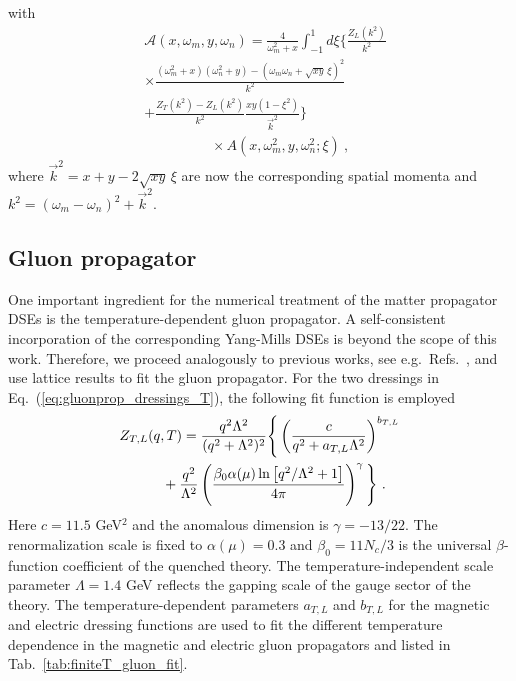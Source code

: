 \documentclass[final,twocolumn,merge,sort&compress]{elsarticle}
\def\Eq#1{Eq.~(\ref{#1})}
\begin{document}
with
\begin{equation}
\label{eq:scaldress_dse_T_2}
\begin{split}
  & \mathcal{A}(x,\omega_m,y,\omega_n) 
   =
    \frac{4}{\omega_m^2+x}\int_{-1}^1 d\xi \Bigg\{\frac{Z_L\left(k^2\right)}{k^2} \\
  & \times \frac{\left(\omega_m^2+x\right) \left(\omega_n^2+y\right) -
      \left(\omega_m\omega_n+\sqrt{xy}\,\xi\right)^2}{k^2} \\
  & +
    \frac{Z_T\left(k^2\right)-Z_L\left(k^2\right)}{k^2}
    \frac{xy\left(1-\xi^2\right)}{\vec{k}^2}\Bigg\} \\
  & \hspace{2cm} \times A(x,\omega_m^2,y,\omega_n^2;\xi) \ ,
\end{split}
\end{equation}
where $\vec{k}^2 = x+y-2\sqrt{xy}\,\xi$ are now the corresponding
spatial momenta and $k^2 = (\omega_m-\omega_n)^2 + \vec{k}^2$.

\subsection{Gluon propagator}
\label{sec:gluon_input}

One important ingredient for the numerical treatment of the matter
propagator DSEs is the temperature-dependent gluon propagator. A
self-consistent incorporation of the corresponding Yang-Mills DSEs is
beyond the scope of this work. Therefore, we proceed analogously to
previous works, see e.g.~Refs.~\cite{Fischer:2009wc, Fischer:2009gk,
  Fischer:2010fx}, and use lattice results to fit the gluon
propagator.  For the two dressings in \Eq{eq:gluonprop_dressings_T},
the following fit function is employed~\cite{Fischer:2010fx}
\begin{equation}
\begin{split}
\label{eq:finiteT_gluon_fit}
Z_{T,L}(q,T) & = \frac{q^2 \Lambda^2}{(q^2 + \Lambda^2)^2} \Bigg\{\left(\frac{c}{q^2 + a_{T,L}\Lambda^2} \right)^{b_{T,L}} \\
& \hspace{-0.5cm} +
\frac{q^2}{\Lambda^2}\left(\frac{\beta_0\alpha(\mu)\ln\left[q^2/\Lambda^2
      + 1\right]}{4\pi} \right)^\gamma\Bigg\} \ .
\end{split}
\end{equation}
Here $c=11.5$ GeV$^2$ and the anomalous dimension is $\gamma=-13/22$.
The renormalization scale is fixed to $\alpha(\mu) = 0.3$ and
$\beta_0 = 11N_c/3$ is the universal $\beta$-function coefficient of
the quenched theory. The temperature-independent scale parameter
$\Lambda=1.4$ GeV reflects the gapping scale of the gauge sector of
the theory. The temperature-dependent parameters $a_{T,L}$ and
$b_{T,L}$ for the magnetic and electric dressing functions are used to
fit the different temperature dependence in the magnetic and electric
gluon propagators and listed in Tab.~\ref{tab:finiteT_gluon_fit}.
\end{document}
